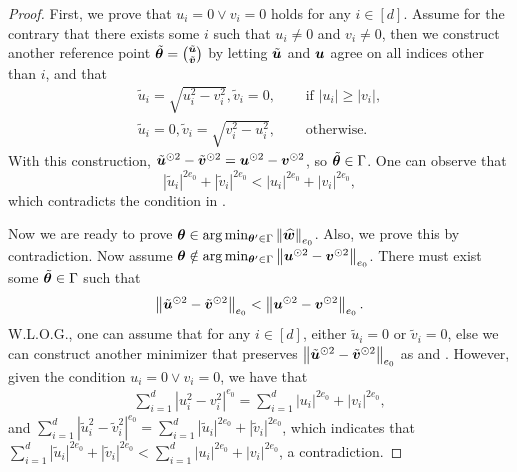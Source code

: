 \begin{proof}
First, we prove that $u_i = 0 \vee v_i = 0$ holds for any $i \in [d]$. Assume for the contrary that there exists some $i$ such that $u_i \neq 0$ and $v_i \neq 0$, then we construct another reference point $\tilde{{\bm{\theta}}} = \tbinom{\tilde{{\bm{u}}}}{\tilde{{\bm{v}}}}$ by letting $\tilde{{\bm{u}}}$ and ${\bm{u}}$ agree on all indices other than $i$, and that 
\begin{align}
    \tilde{u}_i = \sqrt{u_i^2 - v_i^2}, \tilde{v}_i = 0, &\quad  \text{ if } |u_i| \geq |v_i|, \label{equ:u-v-construct-1}\\
    \tilde{u}_i = 0, \tilde{v}_i = \sqrt{v_i^2 - u_i^2}, &\quad  \text{ otherwise.}\label{equ:u-v-construct-2}
\end{align}
With this construction, $\tilde{{\bm{u}}}^{\odot 2} - \tilde{{\bm{v}}}^{\odot 2} = {\bm{u}}^{\odot 2} - {\bm{v}}^{\odot 2}$, so $\tilde{{\bm{\theta}}} \in \Gamma$. One can observe that 
    $$|\tilde{u}_i|^{2e_0} + |\tilde{v}_i|^{2e_0} < |u_i|^{2e_0} +|v_i|^{2e_0},$$
    which contradicts the condition in . 

Now we are ready to prove ${\bm{\theta}} \in \arg \min_{{\bm{\theta}}'\in \Gamma}\left\|\widehat{{\bm{w}}}\right\|_{e_0}$. Also, we prove this by contradiction. Now assume ${\bm{\theta}} \notin \arg\min_{{\bm{\theta}}' \in \Gamma} \left\| {\bm{u}}^{\odot 2} - {\bm{v}}^{\odot 2} \right\|_{e_0}$. There must exist some $\tilde{{\bm{\theta}}} \in \Gamma$ such that 
$$\left\| \tilde{{\bm{u}}}^{\odot 2} - \tilde{{\bm{v}}}^{\odot 2} \right\|_{e_0} < \left\| {\bm{u}}^{\odot 2} - {\bm{v}}^{\odot 2} \right\|_{e_0}.$$
W.L.O.G., one can assume that for any $i \in [d]$, either $\tilde{u}_i = 0$ or $\tilde{v}_i = 0$, else we can construct another minimizer that preserves $\left\| \tilde{{\bm{u}}}^{\odot 2} - \tilde{{\bm{v}}}^{\odot 2} \right\|_{e_0}$ as  and . However, given the condition $u_i =0 \vee v_i =0$, we have that
\begin{align*}
    \sum_{i=1}^{d} |u_i^2-v_i^2|^{e_0} = \sum_{i=1}^{d} |u_i|^{2e_0} + |v_i|^{2e_0},
\end{align*}
and $\sum_{i=1}^{d} |\tilde{u}_i^2-\tilde{v}_i^2|^{e_0} = \sum_{i=1}^{d} |\tilde{u}_i|^{2e_0} + |\tilde{v}_i|^{2e_0}$, which indicates that $\sum_{i=1}^{d} |\tilde{u}_i|^{2e_0} + |\tilde{v}_i|^{2e_0} < \sum_{i=1}^{d} |{u}_i|^{2e_0} + |{v}_i|^{2e_0}$, a contradiction.
\end{proof}